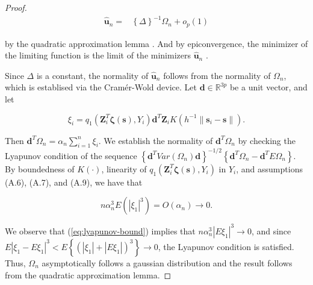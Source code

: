 \documentclass[authoryear,review, 12pt]{elsarticle}
\begin{document}
\begin{proof}
\begin{align*}
\hat{\bm{u}}_{n}= & \left\{ \Delta\right\} ^{-1}\Omega_{n}+o_{p}\left(1\right)
\end{align*}


by the quadratic approximation lemma \citep{Fan-Gijbels-1996}. And
by epiconvergence, the minimizer of the limiting function is the limit
of the minimizers $\hat{\bm{u}}_{n}$ \citep{Geyer-1994,Knight-Fu-2000}.

Since $\Delta$ is a constant, the normality of $\hat{\bm{u}}_{n}$
follows from the normality of $\Omega_{n}$, which is establised via
the Cram\'{e}r-Wold device. Let $\bm{d}\in\mathbb{R}^{3p}$ be a
unit vector, and let

\[
\xi_{i}=q_{1}\left(\bm{Z}_{i}^{T}\bm{\zeta}\left(\bm{s}\right),Y_{i}\right)\bm{d}^{T}\bm{Z}_{i}K\left(h^{-1}\|\bm{s}_{i}-\bm{s}\|\right).
\]


Then $\bm{d}^{T}\Omega_{n}=\alpha_{n}\sum_{i=1}^{n}\xi_{i}$. We establish
the normality of $\bm{d}^{T}\Omega_{n}$ by checking the Lyapunov
condition of the sequence $\left\{ \bm{d}^{T}Var\left(\Omega_{n}\right)\bm{d}\right\} ^{-1/2}\left\{ \bm{d}^{T}\Omega_{n}-\bm{d}^{T}E\Omega_{n}\right\} $.
By boundedness of $K\left(\cdot\right)$, linearity of $q_{1}\left(\bm{Z}_{i}^{T}\bm{\zeta}\left(\bm{s}\right),Y_{i}\right)$
in $Y_{i}$, and assumptions (A.6), (A.7), and (A.9), we have that

\begin{equation}
n\alpha_{n}^{3}E\left(\left|\xi_{1}\right|^{3}\right)=O\left(\alpha_{n}\right)\to0.\label{eq:lyapunov-bound}
\end{equation}


We observe that (\ref{eq:lyapunov-bound}) implies that $n\alpha_{n}^{3}\left|E\xi_{1}\right|^{3}\to0$,
and since $E\left|\xi_{1}-E\xi_{1}\right|^{3}<E\left\{ \left(\left|\xi_{1}\right|+\left|E\xi_{1}\right|\right)^{3}\right\} \to0$,
the Lyapunov condition is satisfied. Thus, $\Omega_{n}$ asymptotically
follows a gaussian distribution and the result follows from the quadratic
approximation lemma.
\end{proof}
\end{document}
